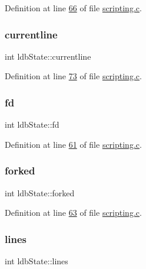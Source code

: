 Definition at line \hyperlink{scripting_8c_source_l00066}{66} of file \hyperlink{scripting_8c_source}{scripting.\+c}.

\mbox{\label{structldbState_a1e52c12b2d7accaf2c77f4372592dc45}} 
\subsubsection{\texorpdfstring{currentline}{currentline}}
{\footnotesize\ttfamily int ldb\+State\+::currentline}



Definition at line \hyperlink{scripting_8c_source_l00073}{73} of file \hyperlink{scripting_8c_source}{scripting.\+c}.

\mbox{\label{structldbState_a9cfd131ac4a3d413728eed06a3ab00c0}} 
\subsubsection{\texorpdfstring{fd}{fd}}
{\footnotesize\ttfamily int ldb\+State\+::fd}



Definition at line \hyperlink{scripting_8c_source_l00061}{61} of file \hyperlink{scripting_8c_source}{scripting.\+c}.

\mbox{\label{structldbState_a4eafad805a1920b9c74ab5d8aae75f1b}} 
\subsubsection{\texorpdfstring{forked}{forked}}
{\footnotesize\ttfamily int ldb\+State\+::forked}



Definition at line \hyperlink{scripting_8c_source_l00063}{63} of file \hyperlink{scripting_8c_source}{scripting.\+c}.

\mbox{\label{structldbState_a312f94c46ccf314d4cab88bada4a9a50}} 
\subsubsection{\texorpdfstring{lines}{lines}}
{\footnotesize\ttfamily int ldb\+State\+::lines}




